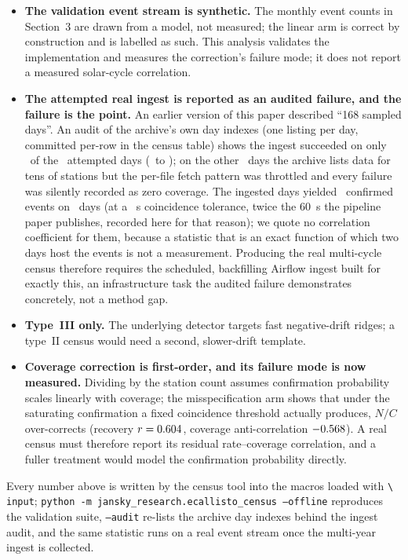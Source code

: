 \documentclass[twocolumn]{aastex631}
\newcommand{\code}[1]{\texttt{#1}}
\begin{document}
\begin{itemize}
\item \textbf{The validation event stream is synthetic.} The monthly event counts in
Section~3 are drawn from a model, not measured; the linear arm is correct by construction and is
labelled as such. This analysis validates the implementation and measures the correction's
failure mode; it does not report a measured solar-cycle correlation.
\item \textbf{The attempted real ingest is reported as an audited failure, and the failure is
the point.} An earlier version of this paper described ``168 sampled days''. An audit of the
archive's own day indexes (one listing per day, committed per-row in the census table) shows the
ingest succeeded on only \ecsRealNdaysIngested\ of the \ecsRealNdaysAttempted\ attempted days
(\ecsRealSpanStart\ to \ecsRealSpanEnd); on the other \ecsRealNdaysFailed\ days the archive
lists data for tens of stations but the per-file fetch pattern was throttled and every failure was
silently recorded as zero coverage. The ingested days yielded \ecsRealNevents\ confirmed events on
\ecsRealNdaysWithEvents\ days (at a \ecsRealTolS~s coincidence tolerance, twice the 60~s the
pipeline paper publishes, recorded here for that reason); we quote no correlation coefficient for
them, because a statistic that is an exact function of which two days host the events is not a
measurement. Producing the real multi-cycle census therefore requires the scheduled, backfilling
Airflow ingest built for exactly this, an infrastructure task the audited failure demonstrates
concretely, not a method gap.
\item \textbf{Type~III only.} The underlying detector targets fast negative-drift ridges; a type~II
census would need a second, slower-drift template.
\item \textbf{Coverage correction is first-order, and its failure mode is now measured.}
Dividing by the station count assumes confirmation probability scales linearly with coverage; the
misspecification arm shows that under the saturating confirmation a fixed coincidence threshold
actually produces, $N/C$ over-corrects (recovery $r=0.604$, coverage anti-correlation
$-0.568$). A real census must therefore report its residual rate--coverage correlation,
and a fuller treatment would model the confirmation probability directly.
\end{itemize}
Every number above is written by the census tool into the macros loaded with \code{\textbackslash
input}; \code{python -m jansky\_research.ecallisto\_census --offline} reproduces the validation
suite, \code{--audit} re-lists the archive day indexes behind the ingest audit, and the same
statistic runs on a real event stream once the multi-year ingest is collected.
\end{document}
